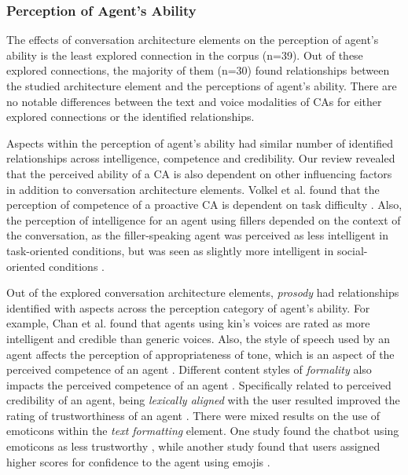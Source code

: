 \subsubsection{Perception of Agent's Ability}

The effects of conversation architecture elements on the perception of agent's ability is the least explored connection in the corpus (n=39). Out of these explored connections, the majority of them (n=30) found relationships between the studied architecture element and the perceptions of agent's ability. There are no notable differences between the text and voice modalities of CAs for either explored connections or the identified relationships.

Aspects within the perception of agent's ability had similar number of identified relationships across intelligence, competence and credibility. Our review revealed that the perceived ability of a CA is also dependent on other influencing factors in addition to conversation architecture elements. Volkel et al. \cite{kraus2020effects}\cmt{[64]} found that the perception of competence of a proactive CA is dependent on task difficulty \cite{kraus2020effects}\cmt{[64]}. Also, the perception of intelligence for an agent using fillers depended on the context of the conversation, as the filler-speaking agent was perceived as less intelligent in task-oriented conditions, but was seen as slightly more intelligent in social-oriented conditions \cite{jeong2019exploring}\cmt{[10]}.

Out of the explored conversation architecture elements, \textit{prosody} had relationships identified with aspects across the perception category of agent's ability. For example, Chan et al. \cite{chan2021kinvoices}\cmt{[74]} found that agents using kin's voices are rated as more intelligent and credible than generic voices. Also, the style of speech used by an agent affects the perception of appropriateness of tone, which is an aspect of the perceived competence of an agent \cite{misu2011toward}\cmt{[83]}. Different content styles of \textit{formality} also impacts the perceived competence of an agent \cite{cox2022does}\cmt{[27]}\cite{jestin2022effects}\cmt{[81]}. Specifically related to perceived credibility of an agent, being \textit{lexically aligned} with the user resulted improved the rating of trustworthiness of an agent \cite{hoegen2019end}\cmt{[31]}\cite{linnemann2018can}\cmt{[15]}. There were mixed results on the use of emoticons within the \textit{text formatting} element. One study found the chatbot using emoticons as less trustworthy \cite{wilhelm2022keep}\cmt{[28]}, while another study found that users assigned higher scores for confidence to the agent using emojis \cite{fadhil2018effect}\cmt{[52]}. 

